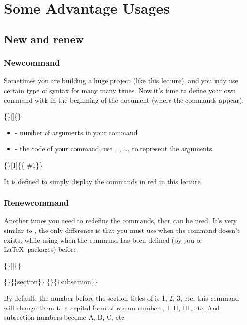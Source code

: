 \section{Some Advantage Usages}
\begin{frame}
\end{frame}

\subsection{New and renew}

\begin{frame}
	\frametitle{Newcommand}
	Sometimes you are building a huge project (like this lecture), and you may use certain type of syntax for many many times. Now it's time to define your own command with  in the beginning of the document (where the  commands appear).
	\begin{command}
		\{\}[]\{\}
		\begin{itemize}
			\item {} - number of arguments in your command
			\item {} - the code of your command, use , , \dots,  to represent the arguments
		\end{itemize}
	\end{command}
	\begin{example}
		\{\}[1]\{\{ \#1\}\}
	\end{example}
	It is defined to simply display the commands in red in this lecture.
\end{frame}

\begin{frame}
	\frametitle{Renewcommand}
	Another times you need to redefine the commands, then  can be used. It's very similar to , the only difference is that you must use  when the command doesn't exists, while using  when the command has been defined (by you or \LaTeX\ packages) before.
	\begin{command}
		\{\}[]\{\structure{code}\}
	\end{command}
	\begin{example}
		\{\}\{\{section\}\}
		\{\}\{\{subsection\}\}
	\end{example}
	By default, the number before the section titles of  is 1, 2, 3, etc, this command will change them to a capital form of roman numbers, I, II, III, etc. And subsection numbers become A, B, C, etc.
\end{frame}


